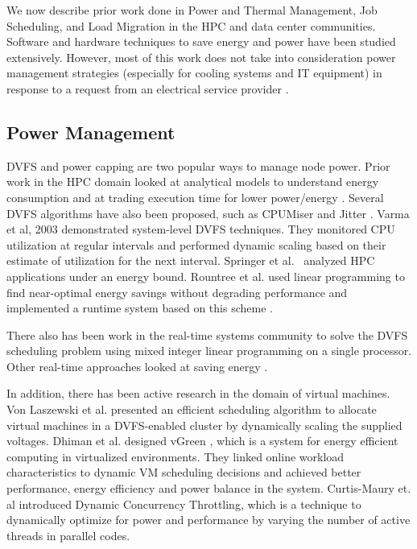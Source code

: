 We now describe prior work done in Power and Thermal Management, Job Scheduling, and Load Migration in the HPC and data center communities. Software and hardware techniques to save energy and power have been studied extensively. However, most of this work does not take into consideration power management strategies (especially for cooling systems and IT equipment) in response to a request from an electrical service provider \cite{Ghatikar2012a}.

\subsection{Power Management}
DVFS and power capping are two popular ways to manage node power. Prior work in the HPC domain looked at analytical models to understand energy consumption \cite{SpringerPPoPP2006,GeICPP2007,LiHPCA2006} and at trading execution time for lower power/energy \cite{CameronSC2005,HsuSC2005}. Several DVFS algorithms have also been proposed, such as CPUMiser \cite{GeICPP2007} and Jitter \cite{KappiahSC2005}. Varma et al, 2003 \cite{varma_control-theoretic_2003} demonstrated system-level DVFS techniques. They monitored CPU utilization at regular intervals and performed dynamic scaling based on their estimate of utilization for the next interval. Springer et al.~\cite{springer:06} analyzed HPC applications under an energy bound. Rountree et al. used linear programming to find near-optimal energy savings without degrading performance \cite{rountree:07} and implemented a runtime system based on this scheme \cite{rountree:09}. 

There also has been work in the real-time systems community to solve the DVFS scheduling problem using mixed integer linear programming on a single processor\cite{IshiharaISLPED1998,SaputraLCTES2002,SwaminathanRTSS2000,SwaminathanASPDAC2001}. Other real-time approaches looked at saving energy \cite{MoncusiRTSS2003,MochockiICCAD2002,MochockiRTAS2005,ZhuTPDS2003,ZhangDAC2002}. 

In addition, there has been active research in the domain of virtual machines. Von Laszewski et al. \cite{von_laszewski_power-aware_2009} presented an efficient scheduling algorithm to allocate virtual machines in a DVFS-enabled cluster by dynamically scaling the supplied voltages. Dhiman et al. designed vGreen \cite{dhiman_vgreen:_2009}, which is a system for energy efficient computing in 
virtualized environments. They linked online workload characteristics to dynamic VM scheduling decisions and achieved better performance, energy
efficiency and power balance in the system. Curtis-Maury et. al \cite{Curtis1,Curtis2,Curtis3} introduced Dynamic Concurrency Throttling, which is a technique to dynamically optimize for power and performance by varying the number of active threads in parallel codes. 

